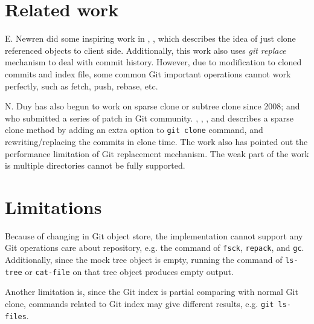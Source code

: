 \documentclass[preprint]{sigplanconf}
\begin{document}
\section{Related work}
E. Newren did some inspiring work in \cite{newren10-0}, \cite{newren10-1},
which describes the idea of just clone referenced objects to client side.
Additionally, this work also uses \emph{git replace} mechanism to deal with
commit history.
However, due to modification to cloned commits and index file, some common Git
important operations cannot work perfectly, such as fetch, push, rebase, etc.

N. Duy has also begun to work on sparse clone or subtree clone since 2008; and
who submitted a series of patch in Git community.
\cite{duy08}, \cite{duy10-1}, \cite{duy10-2}, and \cite{duy10-3} describes a
sparse clone method by adding an extra option to \verb|git clone| command, and
rewriting/replacing the commits in clone time.
The work also has pointed out the performance limitation of Git replacement
mechanism.
The weak part of the work is multiple directories cannot be fully supported.

\section{Limitations}
Because of changing in Git object store, the implementation cannot support
any Git operations care about repository, e.g. the command of \verb|fsck|,
\verb|repack|, and \verb|gc|.
Additionally, since the mock tree object is empty, running the command of
\verb|ls-tree| or \verb|cat-file| on that tree object produces empty output.

Another limitation is, since the Git index is partial comparing with normal Git
clone, commands related to Git index may give different results, e.g.
\verb|git ls-files|.
\end{document}

